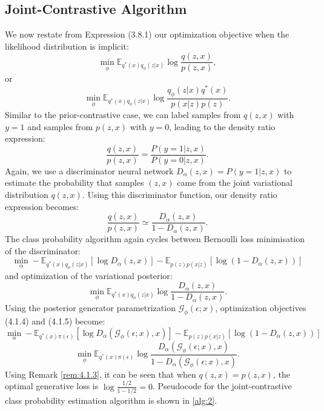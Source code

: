 \documentclass[honours,12pt]{unswthesis}
\numberwithin{equation}{section}
\theoremstyle{definition}
\begin{document}
\subsection{Joint-Contrastive Algorithm}\label{sec:4.1.3}
We now restate from Expression (3.8.1) our optimization objective when the likelihood distribution is implicit:
\[\min_\phi \mathbb{E}_{q^*(x)q_\phi(z|x)}\log \frac{q(z,x)}{p(z,x)},\]
or
\[\min_\phi \mathbb{E}_{q^*(x)q_\phi(z|x)}\log \frac{q_\phi(z|x)q^*(x)}{p(x|z)p(z)}.\]
Similar to the prior-contrastive case, we can label samples from $q(z,x)$ with $y=1$ and samples from $p(z,x)$ with $y=0$, leading to the density ratio expression:
\[\frac{q(z,x)}{p(z,x)}=\frac{P(y=1|z,x)}{P(y=0|z,x)}.\]
Again, we use a discriminator neural network $D_\alpha(z,x)=P(y=1|z,x)$ to estimate the probability that samples $(z,x)$ came from the joint variational distribution $q(z,x)$. Using this discriminator function, our density ratio expression becomes:
\[\frac{q(z,x)}{p(z,x)}\simeq\frac{D_\alpha(z,x)}{1-D_\alpha(z,x)}.\]
The class probability algorithm again cycles between Bernoulli loss minimisation of the discriminator:
\begin{equation}
\min_\alpha -\mathbb{E}_{q^*(x)q_\phi(z|x)}[\log D_\alpha(z,x)]-\mathbb{E}_{p(z)p(x|z)}[\log (1-D_\alpha(z,x))]
\end{equation}
and optimization of the variational posterior:
\begin{equation}
\min_\phi \mathbb{E}_{q^*(x)q_\phi(z|x)}\log\frac{D_\alpha(z,x)}{1-D_\alpha(z,x)}.
\end{equation}
Using the posterior generator parametrization $\mathcal{G}_\phi (\epsilon;x)$, optimization objectives (4.1.4) and (4.1.5) become:
\[\min_\alpha -\mathbb{E}_{q^*(x)\pi(\epsilon)}[\log D_\alpha(\mathcal{G}_\phi(\epsilon;x), x)]-\mathbb{E}_{p(z)p(x|z)}[\log (1-D_\alpha(z,x))]\]
\[\min_\phi \mathbb{E}_{q^*(x)\pi(\epsilon)}\log\frac{D_\alpha(\mathcal{G}_\phi(\epsilon;x),x)}{1-D_\alpha(\mathcal{G}_\phi(\epsilon;x),x)}.\]
Using Remark \ref{rem:4.1.3}, it can be seen that when $q(z,x)=p(z,x)$, the optimal generative loss is $\log \frac{1/2}{1-1/2}=0$. Pseudocode for the joint-contrastive class probability estimation algorithm is shown in \autoref{alg:2}.
\newpage
\end{document}

